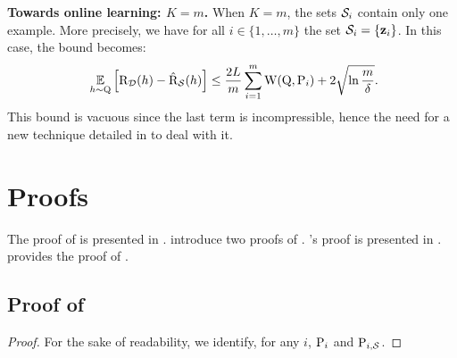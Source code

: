 \begin{noaddcontents}
    \textbf{Towards online learning: $K=m$.} When $K=m$, the sets $\S_i$ contain only one example. 
    More precisely, we have for all $i\in\{1,\dots,m\}$ the set $\S_i=\{\z_i\}$.
    In this case, the bound becomes:
    \begin{align*}
    \ \EE_{h\sim\Q}\Big[ \Risk_{\D}(h) - \Riskhat_{\S}(h) \Big] \le \frac{2L}{m}\sum_{i=1}^{m}\W(\Q, \P_i) + 2\sqrt{\ln\frac{m}{\delta}}.
    \end{align*}
    This bound is vacuous since the last term is incompressible, hence the need for a new technique detailed in  to deal with it.
    
    \section{Proofs}
    \label{sec:proofs}
    
    The proof of  is presented in . 
     introduce two proofs of .
    's proof is presented in .
     provides the proof of .
    
    \subsection{Proof of }
    \label{sec:proof-supervised-ht}
    
    \theoremsupervisedht*
    \begin{proof}
    For the sake of readability, we identify, for any $i$, $\P_i $ and $\P_{i,\S}$.

\end{proof}
\end{noaddcontents}
